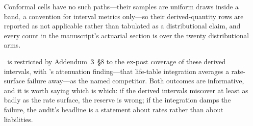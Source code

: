Conformal cells have no such paths---their samples are uniform draws inside a
band, a convention for interval metrics only---so their derived-quantity rows
are reported as not applicable rather than tabulated as a distributional
claim, and every count in the manuscript's actuarial section is over the
twenty distributional arms.

\Hfive\ is restricted by Addendum~3~\S8 to the ex-post coverage of these
derived intervals, with \citet{cairns2011mortality}'s attenuation
finding---that life-table integration averages a rate-surface failure
away---as the named competitor. Both outcomes are informative, and it is worth
saying which is which: if the derived intervals miscover at least as badly as
the rate surface, the reserve is wrong; if the integration damps the failure,
the audit's headline is a statement about rates rather than about liabilities.
